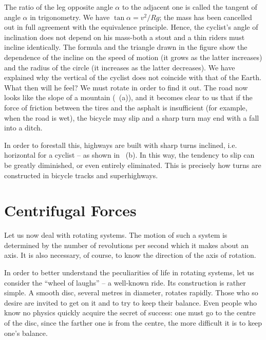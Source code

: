 The ratio of the leg opposite angle $\alpha$ to the adjacent one is called the tangent of angle $\alpha$ in trigonometry. We have $\tan \alpha = v^{2} /R g$; the mass has been cancelled out in full agreement with the equivalence principle. Hence, the cyclist's angle of
inclination does not depend on his mass-both a stout
and a thin riders must incline identically. The formula
and the triangle drawn in the figure show the dependence
of the incline on the speed of motion (it grows as the
latter increases) and the radius of the circle (it increases
as the latter decreases). We have explained why the
vertical of the cyclist does not coincide with that of
the Earth. What then will he feel? We must rotate
 in order to find it out. The road now looks
like the slope of a mountain (~\textcolor{black!70}{(a)}), and it becomes clear to us that if the force of friction between the tires and the asphalt is insufficient (for example, when
the road is wet), the bicycle may slip and a sharp turn
may end with a fall into a ditch.

In order to forestall this, highways are built with
sharp turns inclined, i.e. horizontal for a cyclist -- as
shown in ~\textcolor{black!70}{(b)}. In this way, the tendency to slip can be greatly diminished, or even entirely eliminated. This is precisely how turns are constructed in bicycle
tracks and superhighways.

\section{Centrifugal Forces}
\label{centrifugal}
Let us now deal with rotating systems. The motion of
such a system is determined by the number of revolutions
per second which it makes about an axis. It is also necessary, of course, to know the direction of the axis of rotation.

In order to better understand the peculiarities of life
in rotating systems, let us consider the ``wheel of laughs'' --
a well-known ride. Its construction is rather simple.
A smooth disc, several metres in diameter, rotates rapidly.
Those who so desire are invited to get on it and to try
to keep their balance. Even people who know no physics
quickly acquire the secret of success: one must go to
the centre of the disc, since the farther one is from the
centre, the more difficult it is to keep one's balance.

